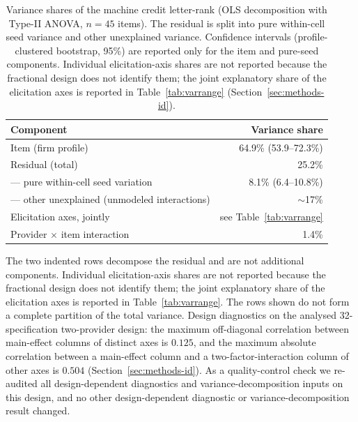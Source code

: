 \documentclass[a4paper,fleqn]{cas-sc}
\begin{document}
\begin{table}[t]\centering
\caption{Variance shares of the machine credit letter-rank (OLS decomposition with Type-II ANOVA,
$n=45$ items). The residual is split into pure within-cell seed variance and other unexplained variance.
Confidence intervals (profile-clustered bootstrap, 95\%) are reported only for the item and pure-seed components. Individual elicitation-axis shares are not reported because the fractional design does not identify them; the joint explanatory share of the elicitation axes is reported in Table~\ref{tab:varrange} (Section~\ref{sec:methods-id}).}\label{tab:var}
\begin{tabular}{lr}\toprule
Component & Variance share \\\midrule
Item (firm profile) & 64.9\% (53.9--72.3\%) \\
Residual (total) & 25.2\% \\
\quad --- pure within-cell seed variation & 8.1\% (6.4--10.8\%) \\
\quad --- other unexplained (unmodeled interactions) & $\sim$17\% \\
Elicitation axes, jointly & see Table~\ref{tab:varrange} \\
Provider $\times$ item interaction & 1.4\% \\\bottomrule
\end{tabular}

\vspace{3pt}
{\footnotesize\raggedright The two indented rows decompose the residual and are not additional
components. Individual elicitation-axis shares are not reported because the fractional design does not identify them; the joint explanatory share of the elicitation axes is reported in Table~\ref{tab:varrange}. The rows shown do not form a complete partition of the total variance. Design diagnostics on the analysed 32-specification two-provider design: the
maximum off-diagonal correlation between main-effect columns of distinct axes is $0.125$, and the
maximum absolute correlation between a main-effect column and a two-factor-interaction column of
other axes is $0.504$ (Section~\ref{sec:methods-id}). As a quality-control check we re-audited all
design-dependent diagnostics and variance-decomposition inputs on this design, and no other
design-dependent diagnostic or variance-decomposition result changed.}
\end{table}
\end{document}
